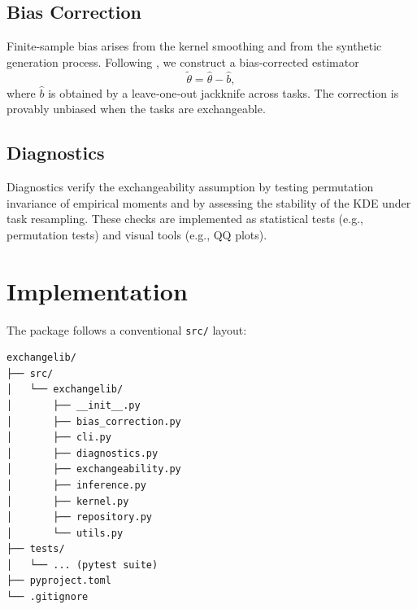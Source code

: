 \documentclass[11pt,a4paper]{article}
\begin{document}
\subsection{Bias Correction}
Finite‑sample bias arises from the kernel smoothing and from the synthetic generation process.  Following \citet{Berger1999}, we construct a bias‑corrected estimator
\[
\tilde{\theta} = \hat{\theta} - \hat{b},
\]
where $\hat{b}$ is obtained by a leave‑one‑out jackknife across tasks.  The correction is provably unbiased when the tasks are exchangeable.

\subsection{Diagnostics}
Diagnostics verify the exchangeability assumption by testing permutation invariance of empirical moments and by assessing the stability of the KDE under task resampling.  These checks are implemented as statistical tests (e.g., permutation tests) and visual tools (e.g., QQ plots).

\section{Implementation}
The package follows a conventional \texttt{src/} layout:

\begin{verbatim}
exchangelib/
├── src/
│   └── exchangelib/
│       ├── __init__.py
│       ├── bias_correction.py
│       ├── cli.py
│       ├── diagnostics.py
│       ├── exchangeability.py
│       ├── inference.py
│       ├── kernel.py
│       ├── repository.py
│       └── utils.py
├── tests/
│   └── ... (pytest suite)
├── pyproject.toml
└── .gitignore
\end{verbatim}
\end{document}
